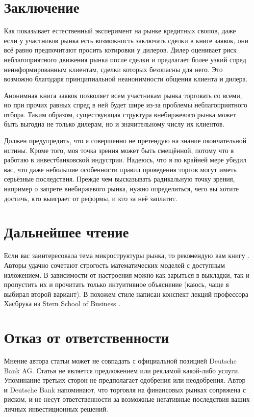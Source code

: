 \section*{Заключение}

Как показывает естественный эксперимент на рынке кредитных свопов, даже если у
участников рынка есть возможность заключать сделки в книге заявок, они всё равно
предпочитают просить котировки у дилеров. Дилер оценивает риск неблагоприятного
движения рынка после сделки и предлагает более узкий спред неинформированным
клиентам, сделки которых безопасны для него. Это возможно благодаря
принципиальной неанонимности общения клиента и дилера.

Анонимная книга заявок позволяет всем участникам рынка торговать со всеми, но
при прочих равных спред в ней будет шире из-за проблемы неблагоприятного отбора.
Таким образом, существующая структура внебиржевого рынка может быть выгодна не
только дилерам, но и значительному числу их клиентов.

Должен предупредить, что я совершенно не претендую на знание окончательной
истины. Кроме того, моя точка зрения может быть смещённой, потому что я работаю
в инвестбанковской индустрии. Надеюсь, что я по крайней мере убедил вас, что
даже небольшие особенности правил проведения торгов могут иметь серьёзные
последствия. Прежде чем высказывать радикальную точку зрения, например о запрете
внебиржевого рынка, нужно определиться, чего вы хотите достичь, кто выиграет от
реформы, и кто за неё заплатит.

\section*{Дальнейшее чтение}

Если вас заинтересовала тема микроструктуры рынка, то рекомендую вам книгу
\cite{foucault2013market}.
Авторы удачно сочетают строгость математических моделей с доступным изложением.
В зависимости от настроения можно как зарыться в выкладки, так и пропустить их и
прочитать только интуитивное объяснение (каюсь, чаще я выбирал второй вариант).
В похожем стиле написан конспект лекций профессора Хасбрука из Stern School of
Business \cite{hasbrouck2017securities}.

\section*{Отказ от ответственности}

Мнение автора статьи может не совпадать с официальной позицией Deutsche Bank AG.
Статья не является предложением или рекламой какой-либо услуги. Упоминание
третьих сторон не предполагает одобрения или неодобрения. Автор и Deutsche Bank
напоминают, что торговля на финансовых рынках сопряжена с риском, и не несут
ответственности за возможные негативные последствия ваших личных инвестиционных
решений.

\begin{otherlanguage}{english}
\printbibliography[title = \begin{otherlanguage}{russian}Список
литературы\end{otherlanguage}]
\end{otherlanguage}

\printendnotes

